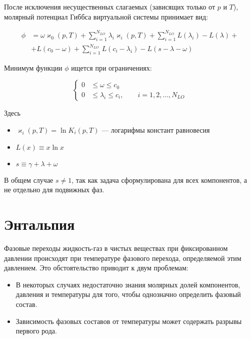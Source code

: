 \documentclass[12pt]{article}
\renewcommand{\leq}{\leqslant}
\begin{document}
После исключения несущественных слагаемых (зависящих только от $p$ и $T$), молярный потенциал Гиббса виртуальной системы принимает вид:

\begin{equation}
\begin{aligned}
{\phi} &= \omega \varkappa_0(p,T) + \sum_{i=1}^{N_{LO}} \lambda_i \varkappa_i(p,T) + \sum_{i=1}^{N_{LO}} L(\lambda_i) - L(\lambda) + \\
&+ L(c_0 - \omega) + \sum_{i=1}^{N_{LO}} L(c_i - \lambda_i) - L(s - \lambda - \omega)
\end{aligned}
\label{eq:pproblem}
\end{equation}

Минимум функции $\phi$ ищется при ограничениях:

\begin{equation}
\left\{
\begin{aligned}
0& \leq \omega \leq c_0\\
0& \leq \lambda_i \leq c_i, \qquad i = 1,2,\dots,N_{LO}
\end{aligned}
\right. \label{eq:restr}
\end{equation}

Здесь
\begin{itemize}
\item $\varkappa_i(p, T) = \ln K_i(p, T)$ --- логарифмы констант равновесия \item $L(x) \equiv x \ln x$ \item $s \equiv \gamma + \lambda + \omega$
\end{itemize}

В общем случае $s \ne 1$, так как задача сформулирована для всех компонентов, а не отдельно для подвижных фаз.



\section{Энтальпия}
Фазовые переходы жидкость-газ в чистых веществах при фиксированном давлении происходят при температуре фазового перехода, определяемой этим давлением. Это обстоятельство приводит к двум проблемам:
\begin{itemize}
\item В некоторых случаях недостаточно знания молярных долей компонентов, давления и температуры для того, чтобы однозначно определить фазовый состав.
\item Зависимость фазовых составов от температуры может содержать разрывы первого рода.
\end{itemize}
\end{document}
